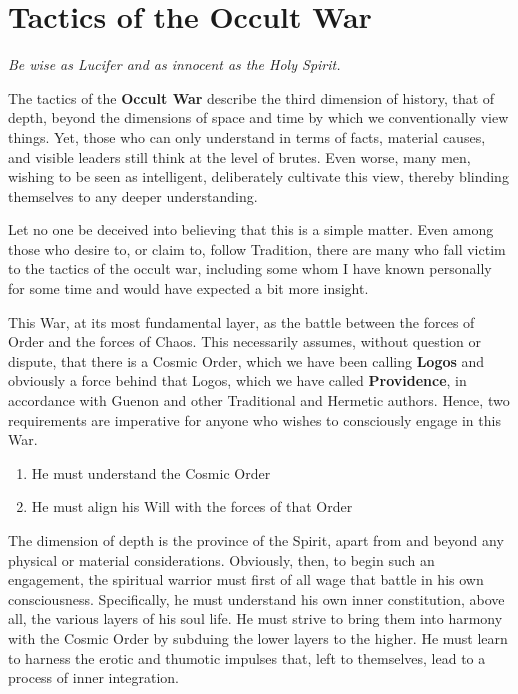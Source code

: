 \section{Tactics of the Occult War}

\label{sec:TacticsOccult}

\begin{quotex}
\emph{Be wise as Lucifer and as innocent as the Holy Spirit.}
\end{quotex}

The tactics of the \textbf{Occult War} describe the third dimension of history, that of depth, beyond the dimensions of space and time by which we conventionally view things. Yet, those who can only understand in terms of facts, material causes, and visible leaders still think at the level of brutes. Even worse, many men, wishing to be seen as intelligent, deliberately cultivate this view, thereby blinding themselves to any deeper understanding.

Let no one be deceived into believing that this is a simple matter. Even among those who desire to, or claim to, follow Tradition, there are many who fall victim to the tactics of the occult war, including some whom I have known personally for some time and would have expected a bit more insight.

This War, at its most fundamental layer, as the battle between the forces of Order and the forces of Chaos. This necessarily assumes, without question or dispute, that there is a Cosmic Order, which we have been calling \textbf{Logos} and obviously a force behind that Logos, which we have called \textbf{Providence}, in accordance with Guenon and other Traditional and Hermetic authors. Hence, two requirements are imperative for anyone who wishes to consciously engage in this War.

\begin{enumerate}


\item He must understand the Cosmic Order

\item He must align his Will with the forces of that Order
\end{enumerate}


The dimension of depth is the province of the Spirit, apart from and beyond any physical or material considerations. Obviously, then, to begin such an engagement, the spiritual warrior must first of all wage that battle in his own consciousness. Specifically, he must understand his own inner constitution, above all, the various layers of his soul life. He must strive to bring them into harmony with the Cosmic Order by subduing the lower layers to the higher. He must learn to harness the erotic and thumotic impulses that, left to themselves, lead to a process of inner integration.

